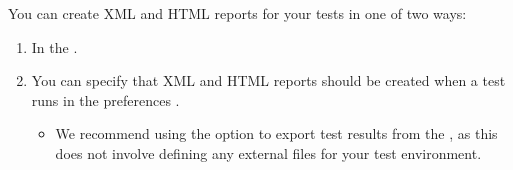 % 
%
%
You can create XML and HTML reports for your tests in one of two ways:

\begin{enumerate}
\item In the \gdtestsummaryview{} .
\item You can specify that XML and HTML reports should be created when a test runs in the preferences  .
\begin{itemize}
\item We recommend using the option to export test results from the \gdtestsummaryview{}, as this does not involve defining any external files for your test environment. 
\end{itemize}
\end{enumerate}


